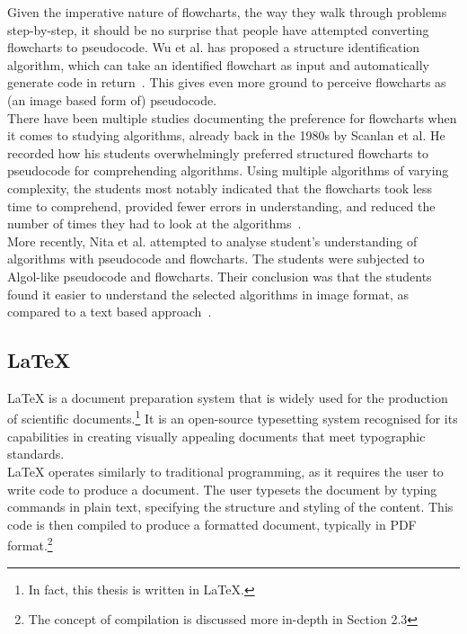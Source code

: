 Given the imperative nature of flowcharts, the way they walk through problems step-by-step, it should be no surprise that people have attempted converting flowcharts to pseudocode. Wu et al. has proposed a structure identification algorithm, which can take an identified flowchart as input and automatically generate code in return~\cite{codeFromFlowcharts}. This gives even more ground to perceive flowcharts as (an image based form of) pseudocode. \\

There have been multiple studies documenting the preference for flowcharts when it comes to studying algorithms, already back in the 1980s by Scanlan et al. He recorded how his students overwhelmingly preferred structured flowcharts to pseudocode for comprehending algorithms. Using multiple algorithms of varying complexity, the students most notably indicated that the flowcharts took less time to comprehend, provided fewer errors in understanding, and reduced the number of times they had to look at the algorithms~\cite{flowchartsAreGood1}. \\

More recently, Nita et al. attempted to analyse student's understanding of algorithms with pseudocode and flowcharts. The students were subjected to Algol-like pseudocode and flowcharts. Their conclusion was that the students found it easier to understand the selected algorithms in image format, as compared to a text based approach~\cite{flowchartsAreGood4}.

\subsection{LaTeX}

LaTeX is a document preparation system that is widely used for the production of scientific documents.\footnote{In fact, this thesis is written in LaTeX.} It is an open-source typesetting system recognised for its capabilities in creating visually appealing documents that meet typographic standards. \\

LaTeX operates similarly to traditional programming, as it requires the user to write code to produce a document. The user typesets the document by typing commands in plain text, specifying the structure and styling of the content. This code is then compiled to produce a formatted document, typically in PDF format.\footnote{The concept of compilation is discussed more in-depth in Section 2.3} \\

